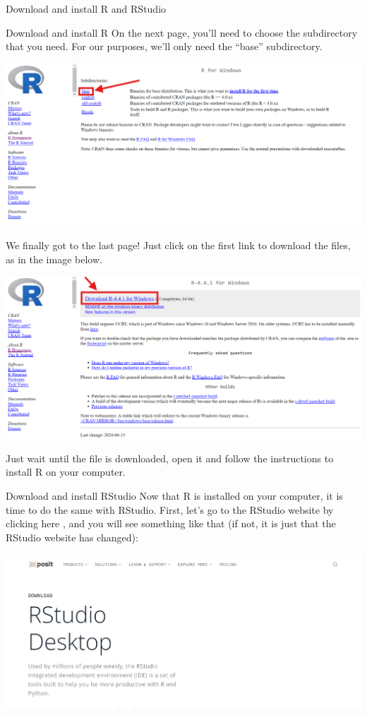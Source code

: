 \documentclass[
  ignorenonframetext,
]{beamer}
\begin{document}
\begin{frame}{Download and install R and RStudio}
\begin{block}{Download and install R}
On the next page, you'll need to choose the subdirectory that you need.
For our purposes, we'll only need the ``base'' subdirectory.

\includegraphics{./assets/images/RWebsite_DownloadSubdirectory.png}

We finally got to the last page! Just click on the first link to
download the files, as in the image below.

\includegraphics{./assets/images/RWebsite_DownloadFinal.png}

Just wait until the file is downloaded, open it and follow the
instructions to install R on your computer.
\end{block}

\begin{block}{Download and install RStudio}
\protect\hypertarget{download-and-install-rstudio}{}
Now that R is installed on your computer, it is time to do the same with
RStudio. First, let's go to the RStudio website by clicking here , and
you will see something like that (if not, it is just that the RStudio
website has changed):

\includegraphics{./assets/images/RStudioWebsite_FrontPage.png}


\end{block}
\end{frame}
\end{document}
